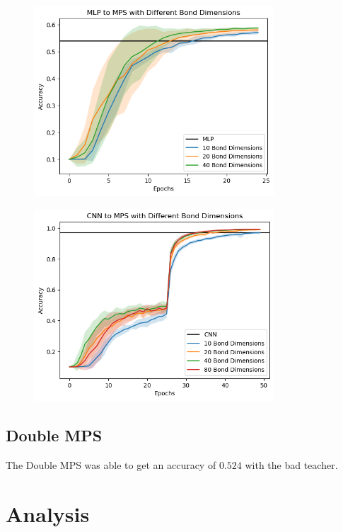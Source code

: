 \documentclass{article}
\theoremstyle{definition}
\theoremstyle{definition}
\begin{document}
\begin{figure}[H]
    \centering
    \caption{}
    \includegraphics[width=0.8\textwidth]{images/images/2023-04-21-18-13-34.png.png}
    \label{fig:MLP_to_MPS}
\end{figure}

\begin{figure}[H]
    \centering
    \caption{}
    \includegraphics[width=0.8\textwidth]{images/2023-04-21-18-13-15.png}
    \label{fig:CNN_to_MPS}
\end{figure}



\subsection{Double MPS}
The Double MPS was able to get an accuracy of $0.524$ with the bad teacher.

\section{Analysis}
\end{document}
